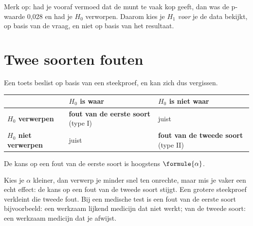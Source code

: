 Merk op: had je vooraf vermoed dat de munt te vaak kop geeft, dan was de p-waarde 0,028 en had je $H_0$ verworpen. Daarom kies je $H_1$ \textit{voor} je de data bekijkt, op basis van de vraag, en niet op basis van het resultaat.

\begin{oefeningen}

\end{oefeningen}

\section{Twee soorten fouten}

Een toets beslist op basis van een steekproef, en kan zich dus vergissen.

\begin{theorie}
{\centering{}\renewcommand{\arraystretch}{1.6}%
\begin{tabular}{|>{\centering\arraybackslash}m{3.6cm}|>{\centering\arraybackslash}m{4.4cm}|>{\centering\arraybackslash}m{4.4cm}|}
\hline
 & \textbf{$H_0$ is waar} & \textbf{$H_0$ is niet waar} \\ \hline
\textbf{$H_0$ verwerpen} & \textbf{\textcolor{accent}{fout van de eerste soort}} (type I) & juist \\ \hline
\textbf{$H_0$ niet verwerpen} & juist & \textbf{\textcolor{accent}{fout van de tweede soort}} (type II) \\ \hline
\end{tabular}\par}

\vspace{1mm}
De kans op een fout van de eerste soort is hoogstens $\formule{\alpha}$.
\end{theorie}

Kies je $\alpha$ kleiner, dan verwerp je minder snel ten onrechte, maar mis je vaker een echt effect: de kans op een fout van de tweede soort stijgt. Een grotere steekproef verkleint die tweede fout. Bij een medische test is een fout van de eerste soort bijvoorbeeld: een werkzaam lijkend medicijn dat niet werkt; van de tweede soort: een werkzaam medicijn dat je afwijst.

